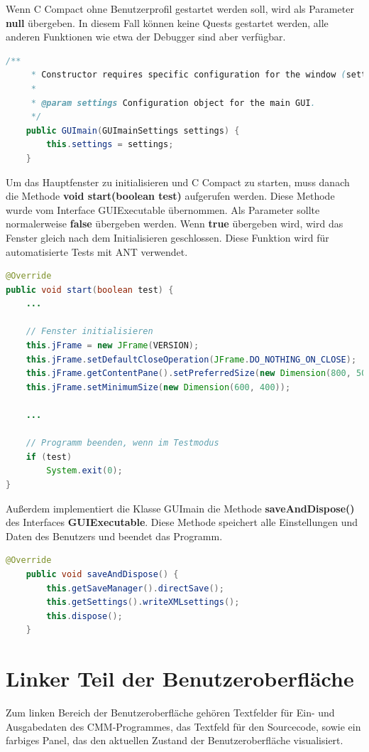 Wenn C Compact ohne Benutzerprofil gestartet werden soll, wird als Parameter \textbf{null} übergeben. In diesem Fall können keine Quests gestartet werden, alle anderen Funktionen wie etwa der Debugger sind aber verfügbar.

\newpage

\begin{lstlisting}[language=JAVA]
	/**
	 * Constructor requires specific configuration for the window (settings)
	 * 
	 * @param settings Configuration object for the main GUI.
	 */
	public GUImain(GUImainSettings settings) {
		this.settings = settings;
	}
\end{lstlisting}

Um das Hauptfenster zu initialisieren und C Compact zu starten, muss danach die Methode \textbf{void start(boolean test)} aufgerufen werden. Diese Methode wurde vom Interface GUIExecutable übernommen. Als Parameter sollte normalerweise \textbf{false} übergeben werden. Wenn \textbf{true} übergeben wird, wird das Fenster gleich nach dem Initialisieren geschlossen. Diese Funktion wird für automatisierte Tests mit ANT verwendet.

\begin{lstlisting}[language=JAVA]
@Override
public void start(boolean test) {
	...
			
	// Fenster initialisieren
	this.jFrame = new JFrame(VERSION);
	this.jFrame.setDefaultCloseOperation(JFrame.DO_NOTHING_ON_CLOSE);
	this.jFrame.getContentPane().setPreferredSize(new Dimension(800, 500));
	this.jFrame.setMinimumSize(new Dimension(600, 400));
		
	...
		
	// Programm beenden, wenn im Testmodus
	if (test)
		System.exit(0);
}
\end{lstlisting}

Außerdem implementiert die Klasse GUImain die Methode \textbf{saveAndDispose()} des Interfaces \textbf{GUIExecutable}. Diese Methode speichert alle Einstellungen und Daten des Benutzers und beendet das Programm.

\begin{lstlisting}[language=JAVA]
	@Override
	public void saveAndDispose() {
		this.getSaveManager().directSave();
		this.getSettings().writeXMLsettings();
		this.dispose();
	}
\end{lstlisting}

\section{Linker Teil der Benutzeroberfläche}
\label{sec:gui-main-left-0}
Zum linken Bereich der Benutzeroberfläche gehören Textfelder für Ein- und Ausgabedaten des CMM-Programmes, das Textfeld für den Sourcecode, sowie ein farbiges Panel, das den aktuellen Zustand der Benutzeroberfläche visualisiert.

